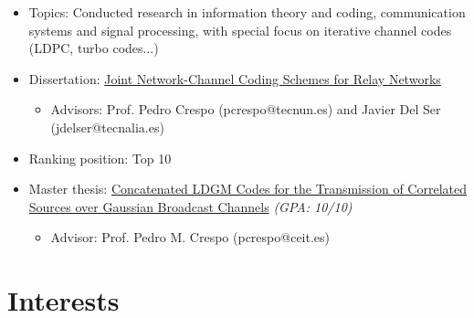 \documentclass[11pt,a4paper,sans]{moderncv}        %
\begin{document}
\vspace{10pt}
\begin{itemize}
 \item{Topics:} Conducted research in information theory and coding, communication systems and signal
processing, with special focus on iterative channel codes (LDPC, turbo codes...)
 \item{Dissertation}: \href{https://stanford.edu/~mhernaez/Thesis_Mikel_Hernaez.pdf}{Joint Network-Channel Coding Schemes for Relay Networks}
 \begin{itemize}
  \item Advisors: Prof. Pedro Crespo (pcrespo@tecnun.es) and Javier Del Ser (jdelser@tecnalia.es)
\end{itemize}
\end{itemize}

\vspace{10pt}
\begin{itemize}
 \item{Ranking position: Top 10}
 \item{Master thesis:} \href{https://stanford.edu/~mhernaez/pfc_imprimir_1.pdf}{Concatenated LDGM Codes for the Transmission of Correlated Sources over Gaussian Broadcast Channels}  \emph{(GPA: 10/10)}
 \begin{itemize}
  \item Advisor: Prof. Pedro M. Crespo (pcrespo@ceit.es)
\end{itemize}
\end{itemize}
\vspace{10pt}






\section{Interests}
\end{document}
